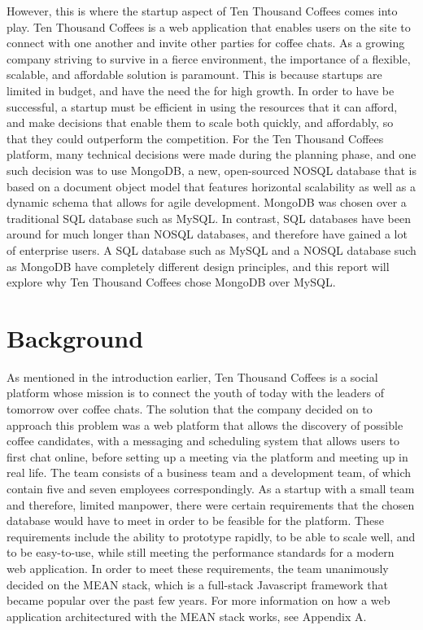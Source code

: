 \documentclass[12pt]{article}
\begin{document}
However, this is where the startup aspect of Ten Thousand Coffees comes into play. Ten Thousand Coffees is a web application that enables users on the site to connect with one another and invite other parties for coffee chats. As a growing company striving to survive in a fierce environment, the importance of a flexible, scalable, and affordable solution is paramount. This is because startups are limited in budget, and have the need the for high growth. In order to have be successful, a startup must be efficient in using the resources that it can afford, and make decisions that enable them to scale both quickly, and affordably, so that they could outperform the competition. For the Ten Thousand Coffees platform, many technical decisions were made during the planning phase, and one such decision was to use MongoDB, a new, open-sourced NOSQL database that is based on a document object model that features horizontal scalability as well as a dynamic schema that allows for agile development. MongoDB was chosen over a traditional SQL database such as MySQL. In contrast, SQL databases have been around for much longer than NOSQL databases, and therefore have gained a lot of enterprise users. A SQL database such as MySQL and a NOSQL database such as MongoDB have completely different design principles, and this report will explore why Ten Thousand Coffees chose MongoDB over MySQL.

\section{Background}
As mentioned in the introduction earlier, Ten Thousand Coffees is a social platform whose mission is to connect the youth of today with the leaders of tomorrow over coffee chats. The solution that the company decided on to approach this problem was a web platform that allows the discovery of possible coffee candidates, with a messaging and scheduling system that allows users to first chat online, before setting up a meeting via the platform and meeting up in real life. The team consists of a business team and a development team, of which contain five and seven employees correspondingly. As a startup with a small team and therefore, limited manpower, there were certain requirements that the chosen database would have to meet in order to be feasible for the platform. These requirements include the ability to prototype rapidly, to be able to scale well, and to be easy-to-use, while still meeting the performance standards for a modern web application. In order to meet these requirements, the team unanimously decided on the MEAN stack, which is a full-stack Javascript framework that became popular over the past few years. For more information on how a web application architectured with the MEAN stack works, see Appendix A.
\end{document}
